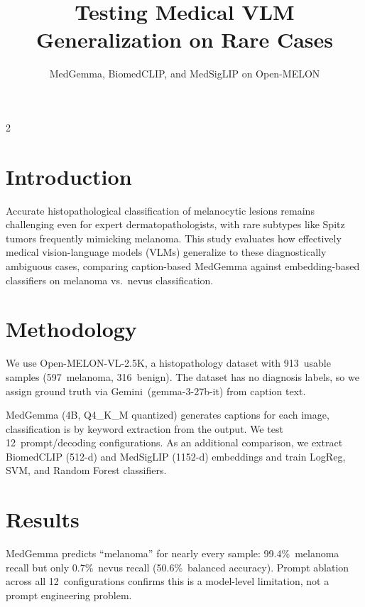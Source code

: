\documentclass[a4paper,10pt]{article}
\title{Testing Medical VLM Generalization on Rare Cases}
\subtitle{MedGemma, BiomedCLIP, and MedSigLIP on Open-MELON}
\begin{document}
\maketitle

\begin{multicols}{2}


\section*{Introduction}
Accurate histopathological classification of melanocytic lesions remains challenging even for expert dermatopathologists, with rare subtypes like Spitz tumors frequently mimicking melanoma. This study evaluates how effectively medical vision-language models (VLMs) generalize to these diagnostically ambiguous cases, comparing caption-based MedGemma against embedding-based classifiers on melanoma vs.\ nevus classification.
\section*{Methodology}
We use Open-MELON-VL-2.5K, a histopathology dataset with 913~usable samples (597~melanoma, 316~benign). The dataset has no diagnosis labels, so we assign ground truth via Gemini~(gemma-3-27b-it) from caption text.

MedGemma (4B, Q4\_K\_M quantized) generates captions for each image, classification is by keyword extraction from the output. We test 12~prompt/decoding configurations. As an additional comparison, we extract BiomedCLIP (512-d) and MedSigLIP (1152-d) embeddings and train LogReg, SVM, and Random Forest classifiers.


\section*{Results}

MedGemma predicts ``melanoma'' for nearly every sample: 99.4\%~melanoma recall but only 0.7\%~nevus recall (50.6\%~balanced accuracy). Prompt ablation across all 12~configurations confirms this is a model-level limitation, not a prompt engineering problem.


\end{multicols}
\end{document}
